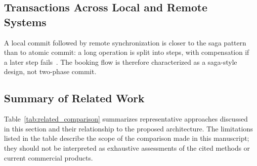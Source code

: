 \documentclass[review,12pt,times,authoryear]{elsarticle}
\theoremstyle{definition}
\begin{document}
\subsection{Transactions Across Local and Remote Systems}
A local commit followed by remote synchronization is closer to the saga pattern than to atomic commit: a long operation is split into steps, with compensation if a later step fails~\citep{GarciaMolina1987}. The booking flow is therefore characterized as a saga-style design, not two-phase commit.

\subsection{Summary of Related Work}
Table~\ref{tab:related_comparison} summarizes representative approaches discussed in this section and their relationship to the proposed architecture. The limitations listed in the table describe the scope of the comparison made in this manuscript; they should not be interpreted as exhaustive assessments of the cited methods or current commercial products.
\end{document}
